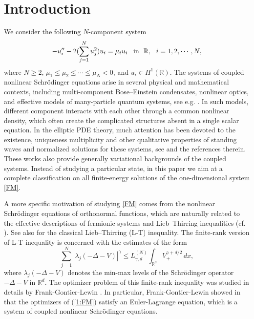 \documentclass[11pt]{article}
\numberwithin{equation}{section}
\newcommand{\R}{{\mathbb{R}}}
\theoremstyle{definition}
\begin{document}
\section{Introduction}
We consider the following $N$-component system
\begin{equation}\label{FM}
-u''_i-2(\sum_{j=1}^N u^2_j)u_i=\mu_iu_i\ \,\ \hbox{in }\ \R,\ \ i=1,2,\cdots,N,
\end{equation}
where \(N\ge2\), \(\mu_1\le \mu_2\le\cdots\le \mu_N<0\), and
\(u_i\in H^1(\mathbb R)\). The systems of coupled nonlinear Schr\"odinger equations arise in several
physical and mathematical contexts, including multi-component
Bose--Einstein condensates, nonlinear optics, and effective models of
many-particle quantum systems, see e.g.
\cite{LS,M,RL,ZS}. In such models, different component
interacts with each other through a common nonlinear density, which often
create the complicated structures absent in a single scalar equation. In the
elliptic PDE theory, much attention has been devoted to the existence, uniqueness
multiplicity and other qualitative properties  of standing waves and
normalized solutions for these systems, see
\cite{A,BS,BZZ,CS,LW,WZZ,WW} and the references therein.  These works also provide
generally  variational backgrounds of the coupled systems.  Instead of studying  a
particular state, in this paper we aim at a complete classification on all finite-energy
solutions of the one-dimensional system \eqref{FM}.


A more specific motivation of studying \eqref{FM} comes from the nonlinear
Schr\"odinger equations of orthonormal functions, which are naturally related
to the effective descriptions of fermionic systems and Lieb--Thirring
inequalities (cf. \cite{Lewin3,Lewin,GLN}).  See also \cite{HLT,LT} for the classical
Lieb--Thirring (L-T) inequality.  The finite-rank version of L-T inequality
is concerned with the estimates of the form
\begin{equation}\label{1:FM}
\sum_{j=1}^N |\lambda_j(-\Delta-V)|^\gamma
\leq L_{\gamma,d}^{(N)}
\int_{\mathbb R^d} V_+^{\gamma+d/2}\,dx ,
\end{equation}
where \(\lambda_j(-\Delta-V)\) denotes the min-max levels of the
Schr\"odinger operator \(-\Delta-V\) in $\R^d$.  The optimizer problem of this
finite-rank inequality was studied in details by Frank-Gontier-Lewin
\cite{Lewin3}. In particular, Frank-Gontier-Lewin showed in \cite{Lewin3} that the optimizers of (\ref{1:FM}) satisfy
an Euler-Lagrange equation, which is a system of coupled nonlinear
Schr\"odinger equations.
\end{document}
